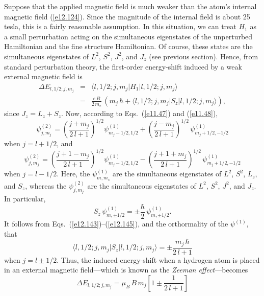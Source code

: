 Suppose that the applied magnetic field is much weaker than the atom's internal
magnetic field (\ref{e12.124}). Since the magnitude of the internal
field is about 25 tesla, this is a fairly reasonable assumption. In this
situation, we can treat $H_1$ as a small perturbation acting
on the simultaneous eigenstates of the unperturbed Hamiltonian and
the fine structure Hamiltonian. Of course, these states
are the simultaneous eigenstates of $L^2$, $S^2$, $J^2$, and $J_z$ (see
previous section). Hence, from standard perturbation theory, the
first-order energy-shift induced by a weak external magnetic field
is
\begin{eqnarray}
\Delta E_{l,1/2;j,m_j} &=& \langle l,1/2;j,m_j|H_1|l,1/2;j,m_j\rangle\nonumber\\[0.5ex]
&=& \frac{e\,B}{2\,m_e}\,\left(m_j\,\hbar + \langle l,1/2;j,m_j|S_z|l,1/2;j,m_j\rangle\right),
\end{eqnarray}
since $J_z=L_z+S_z$. Now, according to Eqs.~(\ref{e11.47}) and
(\ref{e11.48}), 
\begin{equation}\label{e12.143}
\psi^{(2)}_{j,m_j} = \left(\frac{j+m_j}{2\,l+1}\right)^{1/2}\psi^{(1)}_{m_j-1/2,1/2} + \left(\frac{j-m_j}{2\,l+1}\right)^{1/2}\,\psi^{(1)}_{m_j+1/2,-1/2}
\end{equation}
when $j=l+1/2$, and
\begin{equation}
\psi^{(2)}_{j,m_j} = \left(\frac{j+1-m_j}{2\,l+1}\right)^{1/2}\psi^{(1)}_{m_j-1/2,1/2} - \left(\frac{j+1+m_j}{2\,l+1}\right)^{1/2}\,\psi^{(1)}_{m_j+1/2,-1/2}
\end{equation}
when $j=l-1/2$. Here, the $\psi^{(1)}_{m,m_s}$ are the
simultaneous eigenstates of $L^2$, $S^2$, $L_z$, and $S_z$, whereas
the $\psi^{(2)}_{j,m_j}$ are the simultaneous eigenstates of
$L^2$, $S^2$, $J^2$, and $J_z$. In particular,
\begin{equation}\label{e12.145}
S_z\,\psi^{(1)}_{m,\pm 1/2} = \pm \frac{\hbar}{2}\,\psi^{(1)}_{m,\pm 1/2}.
\end{equation}
It follows from Eqs.~(\ref{e12.143})--(\ref{e12.145}), and the
orthormality of the $\psi^{(1)}$, that
\begin{equation}
\langle l,1/2;j,m_j|S_z|l,1/2;j,m_j\rangle = \pm \frac{m_j\,\hbar}{2\,l+1}
\end{equation}
when $j=l\pm 1/2$.  Thus, the induced energy-shift when a hydrogen atom is placed in  an external magnetic field---which is known as the {\em Zeeman effect}---becomes
\begin{equation}\label{e12.147}
\Delta E_{l,1/2;j,m_j} = \mu_B\,B\,m_j\left[1\pm \frac{1}{2\,l+1}\right]
\end{equation}
